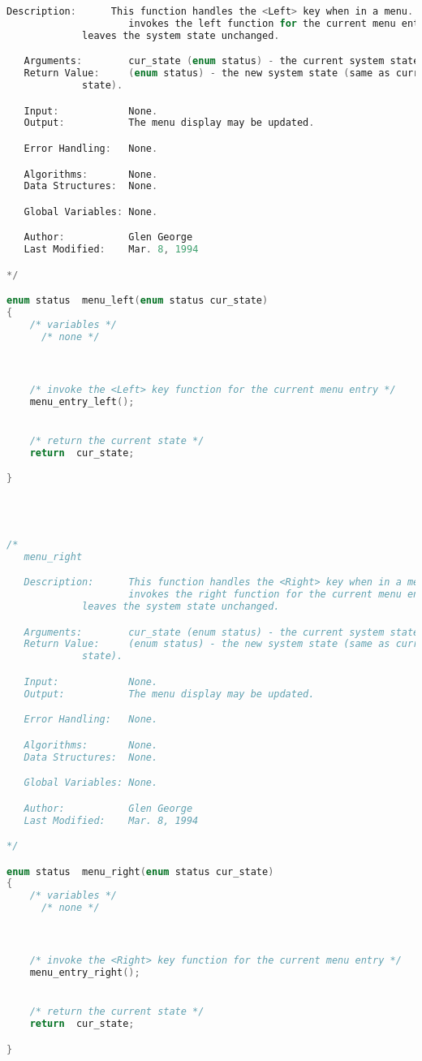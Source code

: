 \begin{lstlisting}[language=C]
   Description:      This function handles the <Left> key when in a menu.  It
                     invokes the left function for the current menu entry and
		     leaves the system state unchanged.

   Arguments:        cur_state (enum status) - the current system state.
   Return Value:     (enum status) - the new system state (same as current
   		     state).

   Input:            None.
   Output:           The menu display may be updated.

   Error Handling:   None.

   Algorithms:       None.
   Data Structures:  None.

   Global Variables: None.

   Author:           Glen George
   Last Modified:    Mar. 8, 1994

*/

enum status  menu_left(enum status cur_state)
{
    /* variables */
      /* none */



    /* invoke the <Left> key function for the current menu entry */
    menu_entry_left();


    /* return the current state */
    return  cur_state;

}




/*
   menu_right

   Description:      This function handles the <Right> key when in a menu.  It
                     invokes the right function for the current menu entry and
		     leaves the system state unchanged.

   Arguments:        cur_state (enum status) - the current system state.
   Return Value:     (enum status) - the new system state (same as current
   		     state).

   Input:            None.
   Output:           The menu display may be updated.

   Error Handling:   None.

   Algorithms:       None.
   Data Structures:  None.

   Global Variables: None.

   Author:           Glen George
   Last Modified:    Mar. 8, 1994

*/

enum status  menu_right(enum status cur_state)
{
    /* variables */
      /* none */



    /* invoke the <Right> key function for the current menu entry */
    menu_entry_right();


    /* return the current state */
    return  cur_state;

}
\end{lstlisting}

